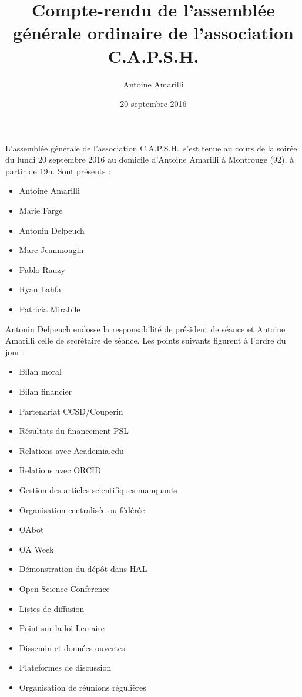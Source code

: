 \documentclass{scrartcl}
\title{Compte-rendu de l'assemblée générale ordinaire de l'association C.A.P.S.H.}
\author{Antoine Amarilli}
\date{20 septembre 2016}
\begin{document}
\maketitle

L'assemblée générale de l'association C.A.P.S.H.\ s'est tenue au cours de la
soirée du lundi 20 septembre 2016 au domicile d'Antoine Amarilli à Montrouge
(92), à partir de 19h.
% 
Sont présents :

\medskip

\begin{itemize}
\item Antoine Amarilli
\item Marie Farge
\item Antonin Delpeuch
\item Marc Jeanmougin
\item Pablo Rauzy
\item Ryan Lahfa
\item Patricia Mirabile
\end{itemize}

\medskip

Antonin Delpeuch endosse la responsabilité de président de séance et Antoine
Amarilli celle de secrétaire de séance. Les points suivants figurent à l'ordre
du jour :

\medskip

\begin{itemize}
\item Bilan moral
\item Bilan financier
\item Partenariat CCSD/Couperin
\item Résultats du financement PSL
\item Relations avec Academia.edu
\item Relations avec ORCID
\item Gestion des articles scientifiques manquants
\item Organisation centralisée ou fédérée
\item OAbot
\item OA Week
\item Démonstration du dépôt dans HAL
\item Open Science Conference
\item Listes de diffusion
\item Point sur la loi Lemaire
\item Dissemin et données ouvertes
\item Plateformes de discussion
\item Organisation de réunions régulières
\end{itemize}
\end{document}
